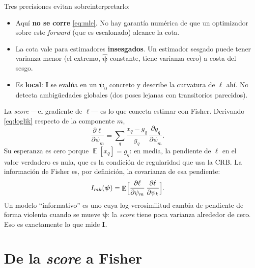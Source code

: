 \documentclass[11pt,a4paper]{article}
\newcommand{\vect}[1]{\boldsymbol{#1}}
\newcommand{\matr}[1]{\mathbf{#1}}
\DeclareMathOperator*{\E}{\mathbb{E}}
\theoremstyle{definition}
\theoremstyle{plain}
\begin{document}
Tres precisiones evitan sobreinterpretarlo:
%
\begin{itemize}[leftmargin=*]
  \item Aqu\'i \textbf{no se corre} \eqref{eq:mle}. No hay garant\'ia num\'erica
        de que un optimizador sobre este \emph{forward} (que es escalonado)
        alcance la cota.
  \item La cota vale para estimadores \textbf{insesgados}. Un estimador sesgado
        puede tener varianza menor (el extremo, $\hat{\vect\psi}$ constante,
        tiene varianza cero) a costa del sesgo.
  \item Es \textbf{local}: $\matr I$ se eval\'ua en un $\vect\psi_0$ concreto y
        describe la curvatura de $\ell$ ah\'i. No detecta ambig\"uedades
        globales (dos poses lejanas con transitorios parecidos).
\end{itemize}

La \emph{score} ---el gradiente de $\ell$--- es lo que conecta estimar con
Fisher. Derivando \eqref{eq:loglik} respecto de la componente $m$,
%
\begin{equation}
\label{eq:score}
\frac{\partial\ell}{\partial\psi_m}
= \sum_q \frac{x_q - g_q}{g_q}\,
  \frac{\partial g_q}{\partial\psi_m}.
\end{equation}
%
Su esperanza es cero porque $\E[x_q]=g_q$: en media, la pendiente de $\ell$
en el valor verdadero es nula, que es la condici\'on de regularidad que usa
la CRB. La informaci\'on de Fisher es, por definici\'on, la covarianza de esa
pendiente:
%
\begin{equation}
\label{eq:def-fisher}
I_{mk}(\vect\psi)
= \E\Bigl[
    \frac{\partial\ell}{\partial\psi_m}\,
    \frac{\partial\ell}{\partial\psi_k}
  \Bigr].
\end{equation}
%
Un modelo \enquote{informativo} es uno cuya log-verosimilitud cambia de
pendiente de forma violenta cuando se mueve $\vect\psi$: la \emph{score} tiene
poca varianza alrededor de cero. Eso es exactamente lo que mide $\matr I$.

\section{De la \emph{score} a Fisher}
\label{sec:fisher}
\end{document}
